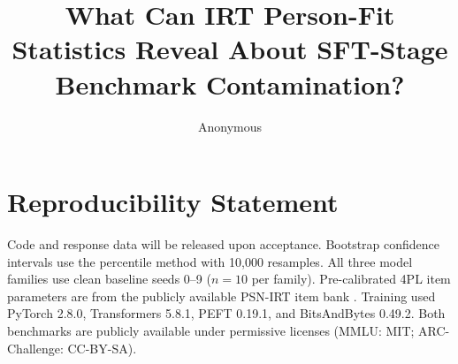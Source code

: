 \documentclass[11pt]{article}
\title{What Can IRT Person-Fit Statistics Reveal About SFT-Stage Benchmark Contamination?}
\author{Anonymous}
\begin{document}
\maketitle

\begin{abstract}

\end{abstract}










\section*{Reproducibility Statement}
Code and response data will be released upon acceptance.
Bootstrap confidence intervals use the percentile method with 10,000 resamples.
All three model families use clean baseline seeds 0--9 ($n{=}10$ per family).
Pre-calibrated 4PL item parameters are from the publicly available PSN-IRT item bank \citep{psnirt2026}.
Training used PyTorch 2.8.0, Transformers 5.8.1, PEFT 0.19.1, and BitsAndBytes 0.49.2.
Both benchmarks are publicly available under permissive licenses (MMLU: MIT; ARC-Challenge: CC-BY-SA).



\appendix

\end{document}

